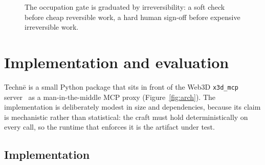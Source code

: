 \documentclass[sigconf,nonacm,screen,anonymous]{acmart}
\begin{document}
\begin{figure}[t]\centering
{}
\caption{The occupation gate is graduated by irreversibility: a soft check before
cheap reversible work, a hard human sign-off before expensive irreversible work.}
\label{fig:gate}
\end{figure}

\section{Implementation and evaluation}\label{sec:eval}

Techn\=e is a small Python package that sits in front of the Web3D \texttt{x3d\_mcp} server~\cite{x3dpy} as a man-in-the-middle MCP proxy (Figure~\ref{fig:arch}). The implementation is deliberately modest in size and dependencies, because its claim is mechanistic rather than statistical: the craft must hold deterministically on every call, so the runtime that enforces it is the artifact under test.

\subsection{Implementation}
\end{document}
